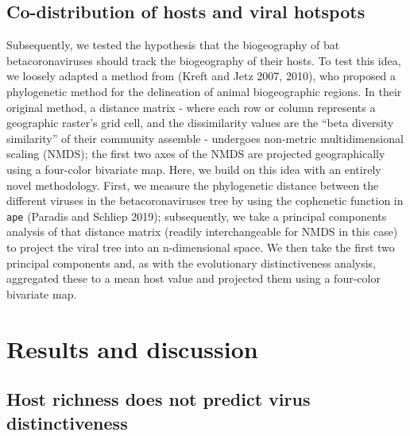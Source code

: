 \documentclass[11pt]{article}
\begin{document}
\hypertarget{co-distribution-of-hosts-and-viral-hotspots}{%
\subsection{Co-distribution of hosts and viral
hotspots}\label{co-distribution-of-hosts-and-viral-hotspots}}

Subsequently, we tested the hypothesis that the biogeography of bat
betacoronaviruses should track the biogeography of their hosts. To test
this idea, we loosely adapted a method from (Kreft and Jetz 2007, 2010),
who proposed a phylogenetic method for the delineation of animal
biogeographic regions. In their original method, a distance matrix -
where each row or column represents a geographic raster's grid cell, and
the dissimilarity values are the ``beta diversity similarity'' of their
community assemble - undergoes non-metric multidimensional scaling
(NMDS); the first two axes of the NMDS are projected geographically
using a four-color bivariate map. Here, we build on this idea with an
entirely novel methodology. First, we measure the phylogenetic distance
between the different viruses in the betacoronaviruses tree by using the
cophenetic function in \texttt{ape} (Paradis and Schliep 2019);
subsequently, we take a principal components analysis of that distance
matrix (readily interchangeable for NMDS in this case) to project the
viral tree into an n-dimensional space. We then take the first two
principal components and, as with the evolutionary distinctiveness
analysis, aggregated these to a mean host value and projected them using
a four-color bivariate map.

\hypertarget{results-and-discussion}{%
\section{Results and discussion}\label{results-and-discussion}}

\hypertarget{host-richness-does-not-predict-virus-distinctiveness}{%
\subsection{Host richness does not predict virus
distinctiveness}\label{host-richness-does-not-predict-virus-distinctiveness}}
\end{document}
